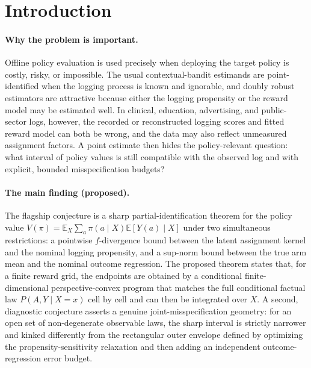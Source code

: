\documentclass[11pt]{article}
\newcommand{\E}{\mathbb{E}}
\theoremstyle{definition}
\theoremstyle{plain}
\theoremstyle{remark}
\begin{document}
\section{Introduction}
\paragraph{Why the problem is important.}
Offline policy evaluation is used precisely when deploying the target policy is costly, risky, or impossible. The usual contextual-bandit estimands are point-identified when the logging process is known and ignorable, and doubly robust estimators are attractive because either the logging propensity or the reward model may be estimated well. In clinical, education, advertising, and public-sector logs, however, the recorded or reconstructed logging scores and fitted reward model can both be wrong, and the data may also reflect unmeasured assignment factors. A point estimate then hides the policy-relevant question: what interval of policy values is still compatible with the observed log and with explicit, bounded misspecification budgets?

\paragraph{The main finding (proposed).}
The flagship conjecture is a sharp partial-identification theorem for the policy value
$V(\pi)=\E_X\sum_a \pi(a\mid X)\E[Y(a)\mid X]$ under two simultaneous restrictions: a pointwise $f$-divergence bound between the latent assignment kernel and the nominal logging propensity, and a sup-norm bound between the true arm mean and the nominal outcome regression. The proposed theorem states that, for a finite reward grid, the endpoints are obtained by a conditional finite-dimensional perspective-convex program that matches the full conditional factual law $P(A,Y\mid X=x)$ cell by cell and can then be integrated over $X$. A second, diagnostic conjecture asserts a genuine joint-misspecification geometry: for an open set of non-degenerate observable laws, the sharp interval is strictly narrower and kinked differently from the rectangular outer envelope defined by optimizing the propensity-sensitivity relaxation and then adding an independent outcome-regression error budget.
\end{document}
